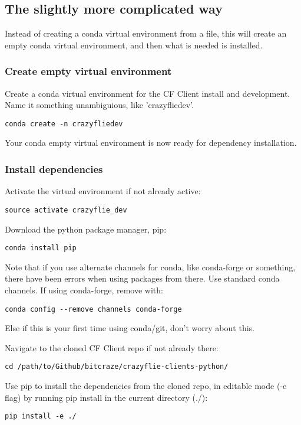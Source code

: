 \documentclass[12pt]{article}
\begin{document}
\subsection{The slightly more complicated way}
Instead of creating a conda virtual environment from a file, this will create an empty conda virtual environment, and then what is needed is installed.

\subsubsection{Create empty virtual environment}
Create a conda virtual environment for the CF Client install and development. Name it something unambiguious, like 'crazyfliedev'. 
\begin{verbatim}
conda create -n crazyfliedev
\end{verbatim}
Your conda empty virtual environment is now ready for dependency installation.

\subsubsection{Install dependencies}
Activate the virtual environment if not already active:
\begin{verbatim}
source activate crazyflie_dev
\end{verbatim}

Download the python package manager, pip:
\begin{verbatim}
conda install pip
\end{verbatim}

\begin{addmargin}[1em]{2em} %
Note that if you use alternate channels for conda, like conda-forge or something, there have been errors when using packages from there. Use standard conda channels. If using conda-forge, remove with:
\begin{verbatim}
conda config --remove channels conda-forge
\end{verbatim}
Else if this is your first time using conda/git, don't worry about this.
\end{addmargin}
Navigate to the cloned CF Client repo if not already there:
\begin{verbatim}
cd /path/to/Github/bitcraze/crazyflie-clients-python/
\end{verbatim}

Use pip to install the dependencies from the cloned repo, in editable mode (-e flag) by running pip install in the current directory (./):
\begin{verbatim}
pip install -e ./
\end{verbatim}
\end{document}
